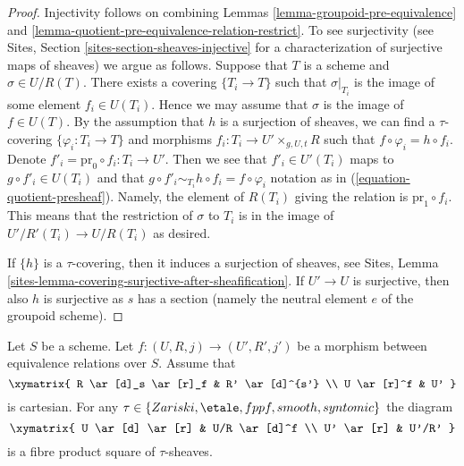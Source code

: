 \begin{proof}
Injectivity follows on combining
Lemmas \ref{lemma-groupoid-pre-equivalence} and
\ref{lemma-quotient-pre-equivalence-relation-restrict}.
To see surjectivity (see
Sites, Section \ref{sites-section-sheaves-injective}
for a characterization of surjective maps of sheaves) we argue as follows.
Suppose that $T$ is a scheme and $\sigma \in U/R(T)$.
There exists a covering $\{T_i \to T\}$ such that $\sigma|_{T_i}$
is the image of some element $f_i \in U(T_i)$. Hence we
may assume that $\sigma$ is the image of $f \in U(T)$.
By the assumption that $h$ is a surjection of sheaves, we
can find a $\tau$-covering $\{\varphi_i : T_i \to T\}$ and morphisms
$f_i : T_i \to U' \times_{g, U, t} R$ such that
$f \circ \varphi_i = h \circ f_i$. Denote
$f'_i = \text{pr}_0 \circ f_i : T_i \to U'$. Then we see that
$f'_i \in U'(T_i)$ maps to $g \circ f'_i \in U(T_i)$ and
that $g \circ f'_i \sim_{T_i} h \circ f_i = f \circ \varphi_i$
notation as in (\ref{equation-quotient-presheaf}). Namely, the
element of $R(T_i)$ giving the relation is $\text{pr}_1 \circ f_i$.
This means that the restriction
of $\sigma$ to $T_i$ is in the image of $U'/R'(T_i) \to U/R(T_i)$
as desired.

\medskip\noindent
If $\{h\}$ is a $\tau$-covering, then it induces a surjection of sheaves, see
Sites, Lemma \ref{sites-lemma-covering-surjective-after-sheafification}.
If $U' \to U$ is surjective, then also $h$ is surjective as $s$ has a section
(namely the neutral element $e$ of the groupoid scheme).
\end{proof}

\begin{lemma}
\label{lemma-criterion-fibre-product}
Let $S$ be a scheme. Let $f : (U, R, j) \to (U', R', j')$ be a morphism
between equivalence relations over $S$. Assume that
$$
\xymatrix{
R \ar[d]_s \ar[r]_f & R' \ar[d]^{s'} \\
U \ar[r]^f & U'
}
$$
is cartesian. For any
$\tau \in  \{Zariski, \etale, fppf, smooth, syntomic\}$
the diagram
$$
\xymatrix{
U \ar[d] \ar[r] & U/R \ar[d]^f \\
U' \ar[r] & U'/R'
}
$$
is a fibre product square of $\tau$-sheaves.
\end{lemma}

